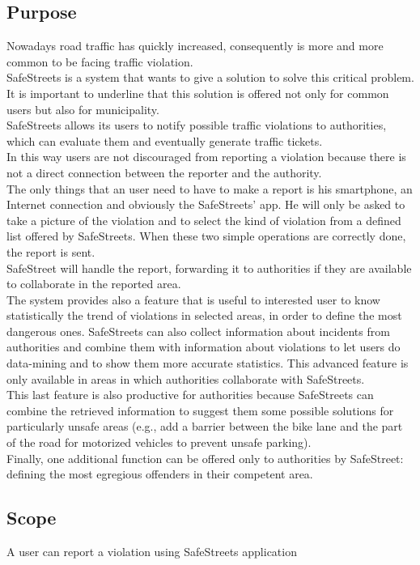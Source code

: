 \documentclass{article}
\begin{document}
		\subsection{Purpose}
		Nowadays road traffic has quickly increased,  consequently is more and more common to be facing traffic violation.\\
			SafeStreets is a system that wants to give a solution to solve this critical problem. It is important to underline that this solution is offered not only for common users but also for municipality.\\
			SafeStreets allows its users to notify possible traffic violations to authorities, which can evaluate them and eventually generate traffic tickets.\\
			In this way users are not discouraged from reporting a violation because there is not a direct connection between the reporter and the authority.\\
			The only things that an user need to have to make a report is his smartphone, an Internet connection and obviously the SafeStreets' app. He will only be asked to take a picture of the violation and to select the kind of violation from a defined list offered by SafeStreets. When these two simple operations are correctly done, the report is sent.\\ 
			SafeStreet will handle the report, forwarding it to authorities if they are available to collaborate in the reported area.\\
			The system provides also a feature that is useful to interested user to know statistically the trend of violations in selected areas, in order to define the most dangerous ones.
			SafeStreets can also collect information about incidents from authorities and combine them with information about violations to let users do data-mining and to show them more accurate statistics. This advanced feature is only available in areas in which authorities collaborate with SafeStreets.\\
			This last feature is also productive for authorities because SafeStreets can combine the retrieved information to suggest them some possible solutions for particularly unsafe areas (e.g., add a barrier between the bike lane and the part of the road for motorized vehicles to prevent unsafe parking).\\
			Finally, one additional function can be offered only to authorities by SafeStreet: defining the most egregious offenders in their competent area.
		
		\subsection{Scope}
			A user can report a violation using SafeStreets application
\end{document}
